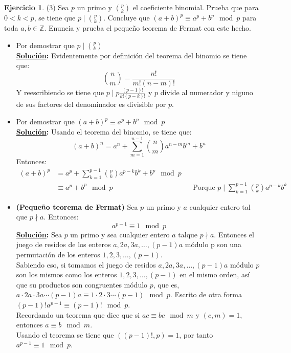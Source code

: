 \documentclass[11pt,letterpaper]{article}
\theoremstyle{definition}\newtheorem{p}{Ejercicio}
\newcommand{\Z}{\mathbb{Z}}
\newcommand{\sol}{\textbf{\underline{Solución}: }} %
\begin{document}
\begin{p}(3)
Sea $p$ un primo y $\binom{p}{k}$ el coeficiente binomial. Prueba que para $0<k<p$, se tiene que
$p\mid\binom{p}{k}$. Concluye que $(a+b)^p\equiv a^p+b^p\mod p$ para toda $a,b\in\Z$. Enuncia y
prueba el peque\~no teorema de Fermat con este hecho.
\begin{itemize}
  \item Por demostrar que $p\mid\binom{p}{k}$\\
  \sol Evidentemente por definición del teorema del binomio se tiene que:
  $$\binom{n}{m} = \frac{n!}{m!(n-m)!}$$
  Y reescribiendo se tiene que $p \mid p \frac{(p-1)!}{k!(p-k)!}$ y $p$ divide al numerador y
  niguno de sus factores del denominador es divisible por $p$.
  
  \item Por demostrar que $(a+b)^p\equiv a^p+b^p\mod p$\\
  \sol Usando el teorema del binomio, se tiene que:
  $$(a+b)^n = a^n + \sum_{m=1}^{n-1} \binom{n}{m}a^{n-m} b^m+ b^n$$
  Entonces:
  \begin{align*}
    (a+b)^p
      &= a^p + \sum_{k=1}^{p-1} \binom{p}{k}a^{p-k}b^k + b^p \mod p\\
      &\equiv a^p + b^p \mod p && \text{Porque $p \mid \sum_{k=1}^{p-1} \binom{p}{k}a^{p-k}b^k$}
  \end{align*}

  \item \textbf{(Pequeño teorema de Fermat)} Sea $p$ un primo y $a$ cualquier entero 
  tal que $p \nmid a$. Entonces:
  $$a^{p-1} \equiv 1 \mod p$$
  \sol Sea $p$ un primo y sea cualquier entero $a$ talque $p \nmid a$. Entonces el juego de residos
  de los enteros $a, 2a, 3a, \ldots , (p-1)a$ módulo p son una permutación de los enteros
  $1,2,3,\ldots,(p-1)$.\\
  Sabiendo eso, si tomamos el juego de residos $a, 2a, 3a, \ldots , (p-1)a$ módulo $p$ son los mismos
  como los enteros $1,2,3,\ldots,(p-1)$ en el mismo orden, así que su productos son congruentes módulo
  $p$, que es, $a \cdot 2a \cdot 3a \cdots (p-1)a \equiv 1 \cdot 2 \cdot 3 \cdots (p-1) \mod p$.
  Escrito de otra forma $(p-1)!a^{p-1} \equiv (p-1)! \mod p$.\\
  Recordando un teorema que dice que si $ac \equiv bc \mod m$ y $(c,m) = 1$, entonces $a \equiv b \mod m$.\\
  Usando el teorema se tiene que $((p-1)!, p)=1$, por tanto $a^{p-1} \equiv 1 \mod p$.
\end{itemize}
\end{p}
\end{document}
